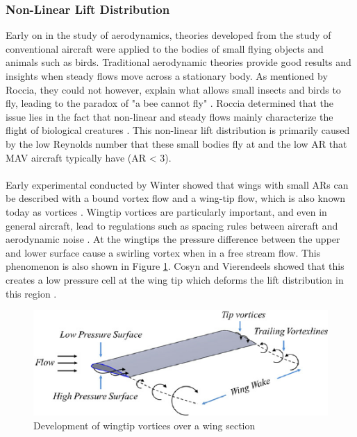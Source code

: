 
\subsubsection{Non-Linear Lift Distribution}


\label{sec:Non-Linear Lift Distribution}
Early on in the study of aerodynamics, theories developed from the study of conventional aircraft were applied to the bodies of small flying objects and animals such as birds. Traditional aerodynamic theories provide good results and insights when steady flows move across a stationary body. As mentioned by Roccia, they could not however, explain what allows small insects and birds to fly, leading to the paradox of "a bee cannot fly" \cite{bees} \cite{Roccia2016}. Roccia determined that the issue lies in the fact that non-linear and steady flows mainly characterize the flight of biological creatures \cite{Roccia2016}. This non-linear lift distribution is primarily caused by the low Reynolds number that these small bodies fly at and the low AR that MAV aircraft typically have (AR < 3).\\
\\
 Early experimental conducted by Winter showed that wings with small ARs can be described with a bound vortex flow and a wing-tip flow, which is also known today as vortices \cite{H1936}. Wingtip vortices are particularly important, and even in general aircraft, lead to regulations such as spacing rules between aircraft and aerodynamic noise \cite{Qin2021}. At the wingtips the pressure difference between the upper and lower surface cause a swirling vortex when in a free stream flow. This phenomenon is also shown in Figure \ref{fig:vortex}. Cosyn and Vierendeels showed that this creates a low pressure cell at the wing tip which deforms the lift distribution in this region \cite{Cosyn2006}. 
 
 \begin{figure}[H]
  \centering
  \includegraphics[width=\linewidth]{03_LiteratureReview/Figs/Development-of-wingtip-vortices-over-a-wing-section.png}
  \caption{ Development of wingtip vortices over a wing section 
 \cite{Kumar2015}}
  \label{fig:vortex}
\end{figure}


